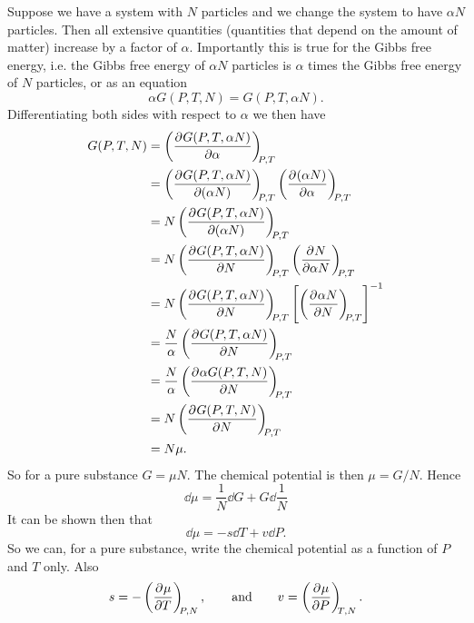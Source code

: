     Suppose we have a system with \(N\) particles and we change the system to have \(\alpha N\) particles.
    Then all extensive quantities (quantities that depend on the amount of matter) increase by a factor of \(\alpha\).
    Importantly this is true for the Gibbs free energy, i.e. the Gibbs free energy of \(\alpha N\) particles is \(\alpha\) times the Gibbs free energy of \(N\) particles, or as an equation
    \[\alpha G(P, T, N) = G(P, T, \alpha N).\]
    Differentiating both sides with respect to \(\alpha\) we then have
    \begin{align*}
        G(P, T, N) &= \pdvconst{G(P, T, \alpha N)}{\alpha}{P, T}\\
        &= \pdvconst{G(P, T, \alpha N)}{(\alpha N)}{P, T}\pdvconst{(\alpha N)}{\alpha}{P, T}\\
        &= N\pdvconst{G(P, T, \alpha N)}{(\alpha N)}{P, T}\\
        &= N\pdvconst{G(P, T, \alpha N)}{N}{P, T}\pdvconst{N}{\alpha N}{P, T}\\
        &= N\pdvconst{G(P, T, \alpha N)}{N}{P, T}\left[\pdvconst{\alpha N}{N}{P, T}\right]^{-1}\\
        &= \frac{N}{\alpha}\pdvconst{G(P, T, \alpha N)}{N}{P, T}\\
        &= \frac{N}{\alpha}\pdvconst{\alpha G(P, T, N)}{N}{P, T}\\
        &= N\pdvconst{G(P, T, N)}{N}{P, T}\\
        &= N\mu.
    \end{align*}
    So for a pure substance \(G = \mu N\).
    The chemical potential is then \(\mu = G/N\).
    Hence 
    \[\dd{\mu} = \frac{1}{N}\dd{G} + G\dd{\frac{1}{N}}\]
    It can be shown then that
    \[\dd{\mu} = -s\dd{T} + v\dd{P}.\]
    So we can, for a pure substance, write the chemical potential as a function of \(P\) and \(T\) only.
    Also
    \[s = -\left(\pdv[]{\mu}{T}\right)_{\!\!{P, N}}, \qquad\text{and}\qquad v = \left(\pdv[]{\mu}{P}\right)_{\!\!{T, N}}.\]
    
